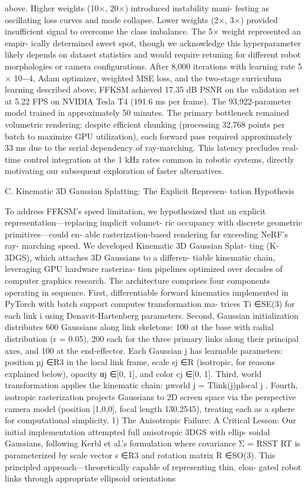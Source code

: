 \documentclass[10pt,twocolumn,letterpaper]{article}
\begin{document}
above. Higher weights (10×, 20×) introduced instability mani- festing as oscillating loss curves and mode collapse. Lower weights (2×, 3×) provided insufficient signal to overcome the class imbalance. The 5× weight represented an empir- ically determined sweet spot, though we acknowledge this hyperparameter likely depends on dataset statistics and would require retuning for different robot morphologies or camera configurations. After 8,000 iterations with learning rate 5 × 10−4, Adam optimizer, weighted MSE loss, and the two-stage curriculum learning described above, FFKSM achieved 17.35 dB PSNR on the validation set at 5.22 FPS on NVIDIA Tesla T4 (191.6 ms per frame). The 93,922-parameter model trained in approximately 50 minutes. The primary bottleneck remained volumetric rendering: despite efficient chunking (processing 32,768 points per batch to maximize GPU utilization), each forward pass required approximately 33 ms due to the serial dependency of ray-marching. This latency precludes real-time control integration at the 1 kHz rates common in robotic systems, directly motivating our subsequent exploration of faster alternatives.

C. Kinematic 3D Gaussian Splatting: The Explicit Represen- tation Hypothesis

To address FFKSM’s speed limitation, we hypothesized that an explicit representation—replacing implicit volumet- ric occupancy with discrete geometric primitives—could en- able rasterization-based rendering far exceeding NeRF’s ray- marching speed. We developed Kinematic 3D Gaussian Splat- ting (K-3DGS), which attaches 3D Gaussians to a differen- tiable kinematic chain, leveraging GPU hardware rasteriza- tion pipelines optimized over decades of computer graphics research. The architecture comprises four components operating in sequence. First, differentiable forward kinematics implemented in PyTorch with batch support computes transformation ma- trices Ti ∈SE(3) for each link i using Denavit-Hartenberg parameters. Second, Gaussian initialization distributes 600 Gaussians along link skeletons: 100 at the base with radial distribution (r = 0.05), 200 each for the three primary links along their principal axes, and 100 at the end-effector. Each Gaussian j has learnable parameters: position µj ∈R3 in the local link frame, scale sj ∈R (isotropic, for reasons explained below), opacity αj ∈[0, 1], and color cj ∈[0, 1]. Third, world transformation applies the kinematic chain: µworld j = Tlink(j)µlocal j . Fourth, isotropic rasterization projects Gaussians to 2D screen space via the perspective camera model (position [1,0,0], focal length 130.2545), treating each as a sphere for computational simplicity. 1) The Anisotropic Failure: A Critical Lesson: Our initial implementation attempted full anisotropic 3DGS with ellip- soidal Gaussians, following Kerbl et al.’s formulation where covariance Σ = RSST RT is parameterized by scale vector s ∈R3 and rotation matrix R ∈SO(3). This principled approach—theoretically capable of representing thin, elon- gated robot links through appropriate ellipsoid orientations
\end{document}
